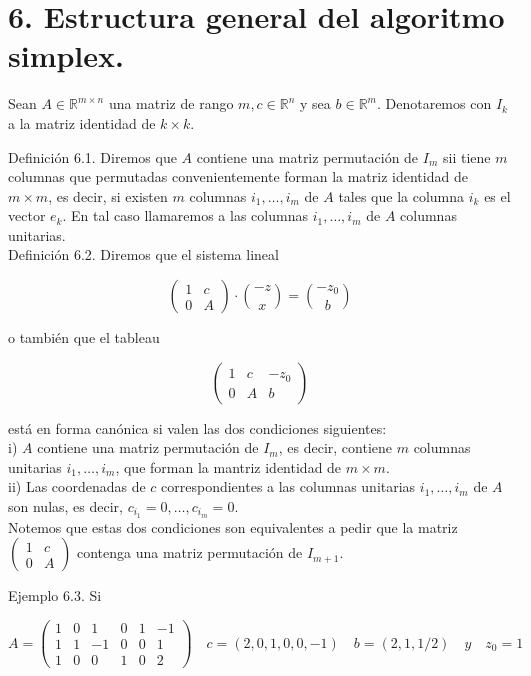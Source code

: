 \documentclass[10pt]{article}
\begin{document}
\section*{6. Estructura general del algoritmo simplex.}
Sean $A \in \mathbb{R}^{m \times n}$ una matriz de rango $m, c \in \mathbb{R}^{n}$ y sea $b \in \mathbb{R}^{m}$. Denotaremos con $I_{k}$ a la matriz identidad de $k \times k$.

Definición 6.1. Diremos que $A$ contiene una matriz permutación de $I_{m}$ sii tiene $m$ columnas que permutadas convenientemente forman la matriz identidad de $m \times m$, es decir, si existen $m$ columnas $i_{1}, \ldots, i_{m}$ de $A$ tales que la columna $i_{k}$ es el vector $e_{k}$. En tal caso llamaremos a las columnas $i_{1}, \ldots, i_{m}$ de $A$ columnas unitarias.\\
Definición 6.2. Diremos que el sistema lineal

$$
\left(\begin{array}{cc}
1 & c \\
0 & A
\end{array}\right) \cdot\binom{-z}{x}=\binom{-z_{0}}{b}
$$

o también que el tableau

$$
\left(\begin{array}{cc|c}
1 & c & -z_{0} \\
0 & A & b
\end{array}\right)
$$

está en forma canónica si valen las dos condiciones siguientes:\\
i) $A$ contiene una matriz permutación de $I_{m}$, es decir, contiene $m$ columnas unitarias $i_{1}, \ldots, i_{m}$, que forman la mantriz identidad de $m \times m$.\\
ii) Las coordenadas de $c$ correspondientes a las columnas unitarias $i_{1}, \ldots, i_{m}$ de $A$ son nulas, es decir, $c_{i_{1}}=0, \ldots, c_{i_{m}}=0$.\\
Notemos que estas dos condiciones son equivalentes a pedir que la matriz $\left(\begin{array}{cc}1 & c \\ 0 & A\end{array}\right)$ contenga una matriz permutación de $I_{m+1}$.

Ejemplo 6.3. Si

$$
A=\left(\begin{array}{cccccc}
1 & 0 & 1 & 0 & 1 & -1 \\
1 & 1 & -1 & 0 & 0 & 1 \\
1 & 0 & 0 & 1 & 0 & 2
\end{array}\right) \quad c=(2,0,1,0,0,-1) \quad b=(2,1,1 / 2) \quad y \quad z_{0}=1
$$
\end{document}
